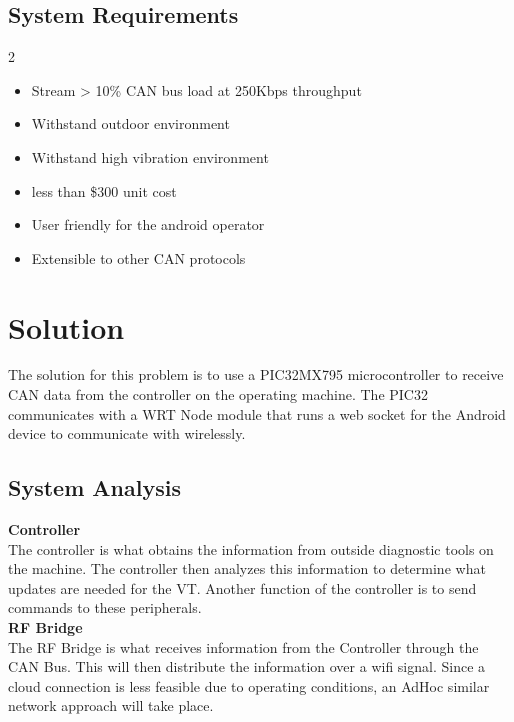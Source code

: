 \documentclass[paper=a4, fontsize=11pt]{scrartcl}
\numberwithin{equation}{section}		%
\numberwithin{figure}{section}			%
\numberwithin{table}{section}				%
\begin{document}
\subsection{System Requirements}
\begin {multicols*}{2}
\begin{itemize}
	\item Stream > 10\%  CAN bus load at 250Kbps throughput
	\item Withstand outdoor environment
	\item Withstand high vibration environment
	\item less than \$300 unit cost
\end{itemize} 

\columnbreak

\begin{itemize}
	\item User friendly for the android operator
	\item Extensible to other CAN protocols
\end{itemize} 
\end{multicols*}
\pagebreak


\section{Solution}
The solution for this problem is to use a PIC32MX795 microcontroller to receive CAN data from the controller on the operating machine. The PIC32 communicates with a WRT Node module that runs a web socket for the Android device to communicate with wirelessly.

\subsection{System Analysis}

\textbf{Controller} \\
The controller is what obtains the information from outside diagnostic tools on the machine. The controller then analyzes this information to determine what updates are needed for the VT. Another function of the controller is to send commands to these peripherals. \\

\textbf{RF Bridge} \\
The RF Bridge is what receives information from the Controller through the CAN Bus. This will then distribute the information over a wifi signal. Since a cloud connection is less feasible due to operating conditions,  an AdHoc similar network approach will take place. \\
\end{document}

